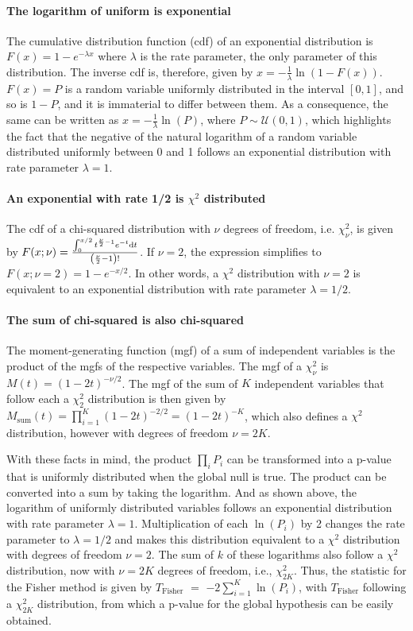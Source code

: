 \paragraph{The logarithm of uniform is exponential} The cumulative distribution function (cdf) of an exponential distribution is $F(x)=1- e^{-\lambda x}$ where $\lambda$ is the rate parameter, the only parameter of this distribution. The inverse cdf is, therefore, given by $x = -\frac{1}{\lambda}\ln(1-F(x))$. $F(x)=P$ is a random variable uniformly distributed in the interval $[0, 1]$, and so is $1-P$, and it is immaterial to differ between them. As a consequence, the same can be written as $x = -\frac{1}{\lambda}\ln(P)$, where $P \sim \mathcal{U}(0,1)$, which highlights the fact that the negative of the natural logarithm of a random variable distributed uniformly between 0 and 1 follows an exponential distribution with rate parameter $\lambda=1$.

\paragraph{An exponential with rate 1/2 is $\chi^2$ distributed} The cdf of a chi-squared distribution with $\nu$ degrees of freedom, i.e. $\chi^{2}_{\nu}$, is given by $F(x; \nu) = \frac{\int_{0}^{x/2} t^{\frac{\nu}{2}-1}e^{-t}{\rm d}t}{\left(\frac{\nu}{2}-1\right)!}$. If $\nu=2$, the expression simplifies to $F(x; \nu=2) = 1-e^{-x/2}$. In other words, a $\chi^{2}$ distribution with $\nu=2$ is equivalent to an exponential distribution with rate parameter $\lambda=1/2$.

\paragraph{The sum of chi-squared is also chi-squared} The moment-generating function (mgf) of a sum of independent variables is the product of the mgfs of the respective variables. The mgf of a $\chi^{2}_{\nu}$ is $M(t) = (1-2t)^{-\nu/2}$. The mgf of the sum of $K$ independent variables that follow each a $\chi^{2}_{2}$ distribution is then given by $M_{\text{sum}}(t) = \prod_{i=1}^{K} (1-2t)^{-2/2} = (1-2t)^{-K}$, which also defines a $\chi^{2}$ distribution, however with degrees of freedom $\nu=2K$.

\vspace{10pt}

With these facts in mind, the product $\prod_{i} P_{i}$ can be transformed into a p-value that is uniformly distributed when the global null is true. The product can be converted into a sum by taking the logarithm. And as shown above, the logarithm of uniformly distributed variables follows an exponential distribution with rate parameter $\lambda=1$. Multiplication of each $\ln(P_{i})$ by 2 changes the rate parameter to $\lambda=1/2$ and makes this distribution equivalent to a $\chi^{2}$ distribution with degrees of freedom $\nu=2$. The sum of $k$ of these logarithms also follow a $\chi^2$ distribution, now with $\nu=2K$ degrees of freedom, i.e., $\chi^{2}_{2K}$. Thus, the statistic for the Fisher method is given by $T_{\text{Fisher}}$ $=$ $-2 \sum_{i=1}^{K} \ln(P_{i})$, with $T_{\text{Fisher}}$ following a $\chi^{2}_{2K}$ distribution, from which a p-value for the global hypothesis can be easily obtained.

